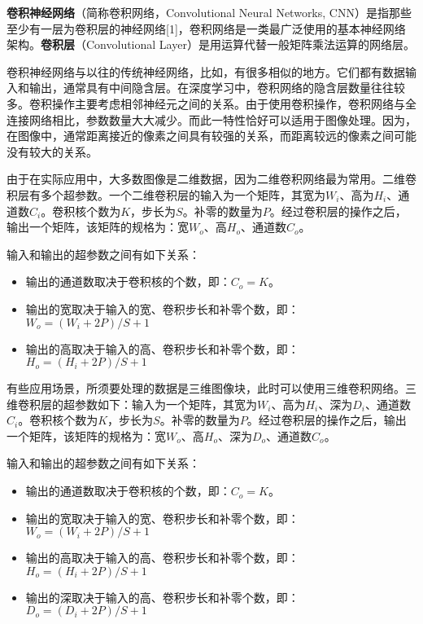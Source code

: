 

\textbf{卷积神经网络}（简称卷积网络，Convolutional Neural Networks, CNN）是指那些至少有一层为卷积层的神经网络[1]，卷积网络是一类最广泛使用的基本神经网络架构。\textbf{卷积层}（Convolutional Layer）是用运算代替一般矩阵乘法运算的网络层。

卷积神经网络与以往的传统神经网络，比如，有很多相似的地方。它们都有数据输入和输出，通常具有中间隐含层。在深度学习中，卷积网络的隐含层数量往往较多。卷积操作主要考虑相邻神经元之间的关系。由于使用卷积操作，卷积网络与全连接网络相比，参数数量大大减少。而此一特性恰好可以适用于图像处理。因为，在图像中，通常距离接近的像素之间具有较强的关系，而距离较远的像素之间可能没有较大的关系。

由于在实际应用中，大多数图像是二维数据，因为二维卷积网络最为常用。二维卷积层有多个超参数。一个二维卷积层的输入为一个矩阵，其宽为$W_i$、高为$H_i$、通道数$C_i$。卷积核个数为$K$，步长为$S$。补零的数量为$P$。经过卷积层的操作之后，输出一个矩阵，该矩阵的规格为：宽$W_o$、高$H_o$、通道数$C_o$。

输入和输出的超参数之间有如下关系： \\
\begin{itemize}
\item 输出的通道数取决于卷积核的个数，即：$C_o=K$。
\item 输出的宽取决于输入的宽、卷积步长和补零个数，即：$W_o=(W_i+2P)/S+1$
\item 输出的高取决于输入的高、卷积步长和补零个数，即：$H_o=(H_i+2P)/S+1$
\end{itemize}

有些应用场景，所须要处理的数据是三维图像块，此时可以使用三维卷积网络。三维卷积层的超参数如下：输入为一个矩阵，其宽为$W_i$、高为$H_i$、深为$D_i$、通道数$C_i$。卷积核个数为$K$，步长为$S$。补零的数量为$P$。经过卷积层的操作之后，输出一个矩阵，该矩阵的规格为：宽$W_o$、高$H_o$、深为$D_o$、通道数$C_o$。

输入和输出的超参数之间有如下关系： \\
\begin{itemize}
\item 输出的通道数取决于卷积核的个数，即：$C_o=K$。
\item 输出的宽取决于输入的宽、卷积步长和补零个数，即：$W_o=(W_i+2P)/S+1$
\item 输出的高取决于输入的高、卷积步长和补零个数，即：$H_o=(H_i+2P)/S+1$
\item 输出的深取决于输入的高、卷积步长和补零个数，即：$D_o=(D_i+2P)/S+1$
\end{itemize}

